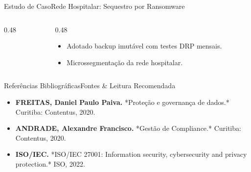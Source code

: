 \begin{senaiframe}{Estudo de Caso}{Rede Hospitalar: Sequestro por Ransomware}
  \begin{columns}[t]
    \begin{column}{0.48\textwidth}
      \begin{tcolorbox}[senairedcard, title={Incidente Real}]
      \end{tcolorbox}
    \end{column}
    \begin{column}{0.48\textwidth}
      \begin{tcolorbox}[senaigreencard, title={Resposta de Governança}]
        \begin{itemize}
          \item Adotado backup imutável com testes DRP mensais.
          \item Microssegmentação da rede hospitalar.
        \end{itemize}
      \end{tcolorbox}
    \end{column}
  \end{columns}
\end{senaiframe}

\begin{senaiframe}{Referências Bibliográficas}{Fontes \& Leitura Recomendada}
  \vspace{0.5cm}
  \begin{tcolorbox}[senaicard, title={Obras de Referência}]
    \begin{itemize}
      \item \textbf{FREITAS, Daniel Paulo Paiva.} *Proteção e governança de dados.* Curitiba: Contentus, 2020.
      \item \textbf{ANDRADE, Alexandre Francisco.} *Gestão de Compliance.* Curitiba: Contentus, 2020.
      \item \textbf{ISO/IEC.} *ISO/IEC 27001: Information security, cybersecurity and privacy protection.* ISO, 2022.
    \end{itemize}
  \end{tcolorbox}
\end{senaiframe}

